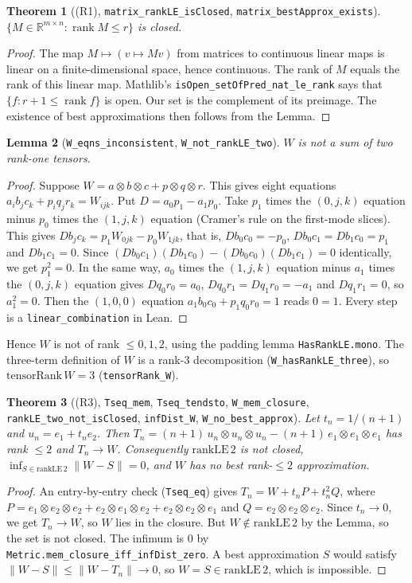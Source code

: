 \documentclass[11pt]{article}
\newtheorem{theorem}{Theorem}
\newtheorem{lemma}[theorem]{Lemma}
\theoremstyle{definition}
\newcommand{\R}{\mathbb{R}}
\begin{document}
\begin{theorem}[(R1), \texttt{matrix\_rankLE\_isClosed}, \texttt{matrix\_bestApprox\_exists}]
$\{M\in\R^{m\times n}:\operatorname{rank}M\le r\}$ is closed.
\end{theorem}
\begin{proof}
The map $M\mapsto (v\mapsto Mv)$ from matrices to continuous linear maps is linear on a
finite-dimensional space, hence continuous. The rank of $M$ equals the rank of this linear
map. Mathlib's \texttt{isOpen\_setOfPred\_nat\_le\_rank} says that
$\{f: r+1\le\operatorname{rank}f\}$ is open. Our set is the complement of its preimage. The
existence of best approximations then follows from the Lemma.
\end{proof}

\begin{lemma}[\texttt{W\_eqns\_inconsistent}, \texttt{W\_not\_rankLE\_two}]
$W$ is not a sum of two rank-one tensors.
\end{lemma}
\begin{proof}
Suppose $W=a\otimes b\otimes c+p\otimes q\otimes r$. This gives eight equations
$a_ib_jc_k+p_iq_jr_k=W_{ijk}$. Put $D=a_0p_1-a_1p_0$. Take $p_1$ times the $(0,j,k)$
equation minus $p_0$ times the $(1,j,k)$ equation (Cramer's rule on the first-mode slices).
This gives $Db_jc_k=p_1W_{0jk}-p_0W_{1jk}$, that is,
$Db_0c_0=-p_0$, $Db_0c_1=Db_1c_0=p_1$ and $Db_1c_1=0$. Since
$(Db_0c_1)(Db_1c_0)-(Db_0c_0)(Db_1c_1)=0$ identically, we get $p_1^2=0$. In the same way,
$a_0$ times the $(1,j,k)$ equation minus $a_1$ times the $(0,j,k)$ equation gives
$Dq_0r_0=a_0$, $Dq_0r_1=Dq_1r_0=-a_1$ and $Dq_1r_1=0$, so $a_1^2=0$. Then the $(1,0,0)$
equation $a_1b_0c_0+p_1q_0r_0=1$ reads $0=1$. Every step is a \texttt{linear\_combination}
in Lean.
\end{proof}
Hence $W$ is not of rank $\le 0,1,2$, using the padding lemma \texttt{HasRankLE.mono}. The
three-term definition of $W$ is a rank-$3$ decomposition (\texttt{W\_hasRankLE\_three}), so
$\mathrm{tensorRank}\,W=3$ (\texttt{tensorRank\_W}).

\begin{theorem}[(R3), \texttt{Tseq\_mem}, \texttt{Tseq\_tendsto}, \texttt{W\_mem\_closure},
\texttt{rankLE\_two\_not\_isClosed}, \texttt{infDist\_W}, \texttt{W\_no\_best\_approx}]
Let $t_n=1/(n+1)$ and $u_n=e_1+t_ne_2$. Then
$T_n=(n+1)\,u_n\otimes u_n\otimes u_n-(n+1)\,e_1\otimes e_1\otimes e_1$ has rank $\le2$ and
$T_n\to W$. Consequently $\mathrm{rankLE}\,2$ is not closed,
$\inf_{S\in\mathrm{rankLE}\,2}\|W-S\|=0$, and $W$ has no best rank-$\le2$ approximation.
\end{theorem}
\begin{proof}
An entry-by-entry check (\texttt{Tseq\_eq}) gives $T_n=W+t_nP+t_n^2Q$, where
$P=e_1\otimes e_2\otimes e_2+e_2\otimes e_1\otimes e_2+e_2\otimes e_2\otimes e_1$ and
$Q=e_2\otimes e_2\otimes e_2$. Since $t_n\to0$, we get $T_n\to W$, so $W$ lies in the closure.
But $W\notin\mathrm{rankLE}\,2$ by the Lemma, so the set is not closed. The infimum is $0$
by \texttt{Metric.mem\_closure\_iff\_infDist\_zero}. A best approximation $S$ would satisfy
$\|W-S\|\le\|W-T_n\|\to0$, so $W=S\in\mathrm{rankLE}\,2$, which is impossible.
\end{proof}
\end{document}
